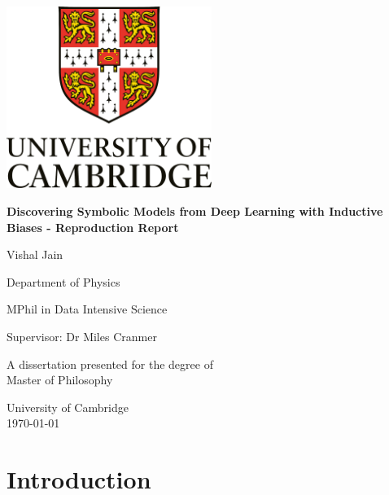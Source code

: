 \documentclass[11pt]{article}
\begin{document}
\begin{titlepage}
    \centering
    \vspace*{1cm}
    
    \includegraphics[width=0.5\textwidth]{figs/logo.png} %
    
    \vspace{1.5cm}
    
    {\Large\bfseries Discovering Symbolic Models from Deep Learning with Inductive Biases - Reproduction Report\par}
    
    \vspace{2cm}
    
    {\Large Vishal Jain \par}
    
    \vspace{1cm}
    
    {\large Department of Physics \par}
    \vspace{1cm}
    {\large MPhil in Data Intensive Science \par}
    \vspace{1cm}
    {\large Supervisor: Dr Miles Cranmer \par}
    
    \vfill
    A dissertation presented for the degree of\\
    Master of Philosophy
    
    \vspace{0.8cm}
    
    \Large University of Cambridge\\
    \today %
    
\end{titlepage}
\tableofcontents
\newpage
\section{Introduction}
\end{document}
